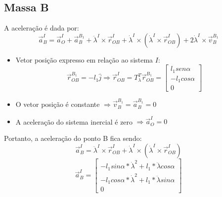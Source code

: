 \documentclass[a4paper, 12pt]{article}
\begin{document}
	\subsection{Massa B}
	A aceleração é dada por:
	\begin{equation}
		\vec{a}_B^I = \vec{a}_O^I + \vec{a}_B^{B_1} + \ddot{\lambda}^I \times \vec{r}_{OB}^{I} + \dot{\lambda}^I \times (\dot{\lambda}^I \times \vec{r}_{OB}^{I}) + 2\dot{\lambda}^I \times \vec{v}_B^{B_1}
	\end{equation}
	\begin{itemize}
		\item Vetor posição expresso em relação ao sistema $I$: 
			\begin{equation}
				\vec{r}_{OB}^{B_1} = -l_1 \hat{j} \Rightarrow \vec{r}_{OB}^{I} = T^T_{\lambda}\vec{r}_{OB}^{B_1} = \begin{bmatrix}
			l_1sen \alpha\\
			-l_1cos\alpha\\
			0
		\end{bmatrix}
			\end{equation}					
		

		\item O vetor posição é constante $\Rightarrow \vec{v}_B^{B_1} = \vec{a}_B^{B_1} = 0$
		\item A aceleração do sistema inercial é zero $\Rightarrow \vec{a}_O^I = 0$
	\end{itemize}
	Portanto, a aceleração do ponto B fica sendo:
	\begin{equation}
		\vec{a}_B^I = \ddot{\lambda}^I \times \vec{r}_{OB}^{I} + \dot{\lambda}^I \times (\dot{\lambda}^I \times \vec{r}_{OB}^{I})
	\end{equation}
	\begin{equation}
		\vec{a}_B^I =\begin{bmatrix}
			-l_1 sin\alpha * \dot{\lambda}^2 + l_1*\ddot{\lambda} cos\alpha \\
			-l_1 cos\alpha * \dot{\lambda}^2 + l_1*\ddot{\lambda} sin\alpha \\
			0
		\end{bmatrix}
	\end{equation}
\end{document}
